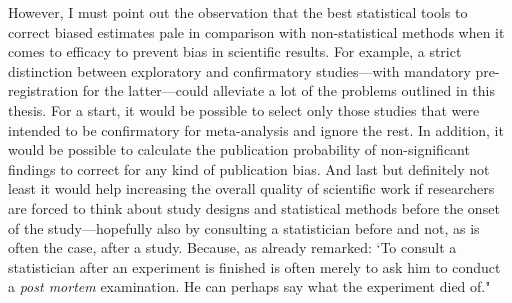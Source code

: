 However, I must point out the observation that the best statistical tools to correct biased estimates pale in comparison with non-statistical methods when it comes to efficacy to prevent bias in scientific results. For example, a strict distinction between exploratory and confirmatory studies---with mandatory pre-registration for the latter---could alleviate a lot of the problems outlined in this thesis. For a start, it would be possible to select only those studies that were intended to be confirmatory for meta-analysis and ignore the rest. In addition, it would be possible to calculate the publication probability of non-significant findings to correct for any kind of publication bias. And last but definitely not least it would help increasing the overall quality of scientific work if researchers are forced to think about study designs and statistical methods before the onset of the study---hopefully also by consulting a statistician before and not, as is often the case, after a study. Because, as \citet[p.~17]{fisher_presidential_1938} already remarked: `To consult a statistician after an experiment is finished is often merely to ask him to conduct a \textit{post mortem} examination. He can perhaps say what the experiment died of."
\vspace*{\fill}


